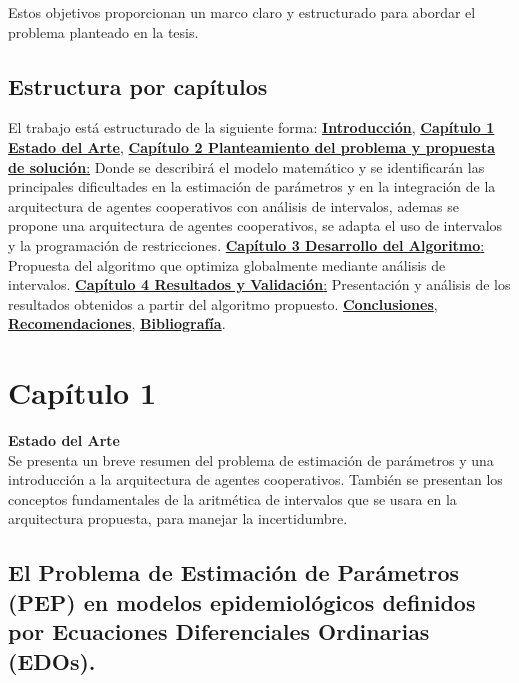 \documentclass{article}
\begin{document}
Estos objetivos proporcionan un marco claro y estructurado para abordar el problema planteado en la tesis.

\subsection*{Estructura por capítulos}

El trabajo está estructurado de la siguiente forma: \hyperref[sec:12]{ \textbf{Introducción}}, \hyperref[sec:13]{ \textbf{Capítulo 1 Estado del Arte}},
\hyperref[sec:14]{ \textbf{Capítulo 2 Planteamiento del problema y propuesta de solución}:} Donde se describirá el modelo matemático y se identificarán las principales dificultades
en la estimación de parámetros y en la integración de la arquitectura de agentes cooperativos con análisis de intervalos, ademas se propone una arquitectura de agentes cooperativos, se adapta el uso de intervalos y la programación de restricciones. \hyperref[sec:16]{ \textbf{Capítulo 3 Desarrollo del Algoritmo}:}
Propuesta del algoritmo que optimiza globalmente mediante análisis de intervalos. \hyperref[sec:17]{ \textbf{Capítulo 4 Resultados y Validación}:} Presentación y
análisis de los resultados obtenidos a partir del algoritmo propuesto. \hyperref[sec:18]{\textbf{Conclusiones}}, \hyperref[sec:20]{\textbf{Recomendaciones}}, \hyperref[sec:21]{ \textbf{Bibliografía}}.

\newpage

\section*{ \Huge Capítulo 1 }
\large \textbf{ Estado del Arte }
\label{sec:13} \\

    Se presenta un breve resumen del problema de estimación de parámetros y una introducción a la arquitectura de agentes cooperativos. También se presentan los conceptos fundamentales de la aritmética de intervalos que se usara en la arquitectura propuesta, para manejar la incertidumbre.

    \subsection*{ El Problema de Estimación de Parámetros (PEP) en modelos epidemiológicos definidos por Ecuaciones Diferenciales Ordinarias (EDOs).} \\
\end{document}
